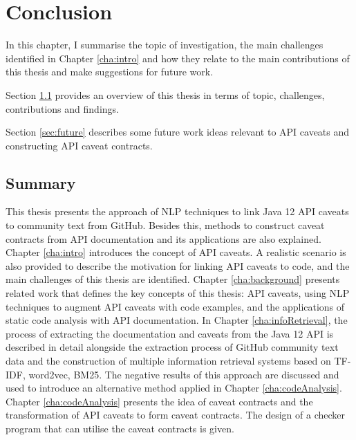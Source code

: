 \chapter{Conclusion}
\label{cha:conc}
In this chapter, I summarise the topic of investigation, the main challenges identified in Chapter \ref{cha:intro} and how they relate to the main contributions of this thesis and make suggestions for future work. \bigbreak

Section \ref{sec:summary} provides an overview of this thesis in terms of topic, challenges, contributions and findings.\bigbreak

Section \ref{sec:future} describes some future work ideas relevant to API caveats and constructing API caveat contracts.\bigbreak 

\section{Summary}
\label{sec:summary}
This thesis presents the approach of NLP techniques to link Java 12 API caveats to community text from GitHub. Besides this, methods to construct caveat contracts from API documentation and its applications are also explained. Chapter \ref{cha:intro} introduces the concept of API caveats. A realistic scenario is also provided to describe the motivation for linking API caveats to code, and the main challenges of this thesis are identified. Chapter \ref{cha:background} presents related work that defines the key concepts of this thesis: API caveats, using NLP techniques to augment API caveats with code examples, and the applications of static code analysis with API documentation. In Chapter \ref{cha:infoRetrieval}, the process of extracting the documentation and caveats from the Java 12 API is described in detail alongside the extraction process of GitHub community text data and the construction of multiple information retrieval systems based on TF-IDF, word2vec, BM25. The negative results of this approach are discussed and used to introduce an alternative method applied in Chapter \ref{cha:codeAnalysis}. Chapter \ref{cha:codeAnalysis} presents the idea of caveat contracts and the transformation of API caveats to form caveat contracts. The design of a checker program that can utilise the caveat contracts is given.\bigbreak

